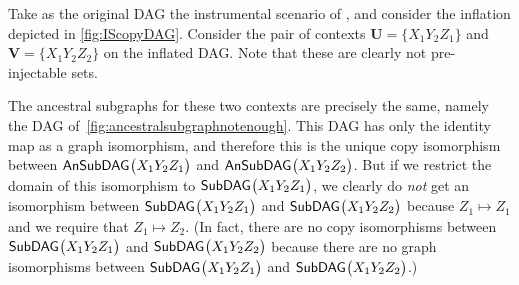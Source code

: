 {Take as the original DAG the instrumental scenario of \citet{pearl1995instrumental}, and consider the inflation depicted in \cref{fig:IScopyDAG}.  Consider the pair of contexts $\bm{U} = \{ X_1 Y_2 Z_1\}$ and $\bm{V}= \{ X_1 Y_2 Z_2\}$ on the inflated DAG.  Note that these are clearly not pre-injectable sets. 

The ancestral subgraphs for these two contexts are precisely the same, namely the DAG of~\cref{fig:ancestralsubgraphnotenough}.  This DAG has only the identity map as a graph isomorphism, and therefore this is the unique copy isomorphism between ${\operatorname{\mathsf{AnSubDAG}}_{}}\bigl\lparen X_1 Y_2 Z_1\bigr\rparen$ and ${\operatorname{\mathsf{AnSubDAG}}_{}}\bigl\lparen X_1 Y_2 Z_2\bigr\rparen$.  But if we restrict the domain of this isomorphism to ${\operatorname{\mathsf{SubDAG}}_{}}\bigl\lparen X_1 Y_2 Z_1\bigr\rparen$, we clearly do {\em not} get an isomorphism between ${\operatorname{\mathsf{SubDAG}}_{}}\bigl\lparen X_1 Y_2 Z_1\bigr\rparen$ and ${\operatorname{\mathsf{SubDAG}}_{}}\bigl\lparen X_1 Y_2 Z_2\bigr\rparen$ because $Z_1 \mapsto Z_1$ and we require that $Z_1 \mapsto Z_2$.  (In fact, there are no copy isomorphisms between ${\operatorname{\mathsf{SubDAG}}_{}}\bigl\lparen X_1 Y_2 Z_1\bigr\rparen$ and ${\operatorname{\mathsf{SubDAG}}_{}}\bigl\lparen X_1 Y_2 Z_2\bigr\rparen$ because there are no graph isomorphisms between ${\operatorname{\mathsf{SubDAG}}_{}}\bigl\lparen X_1 Y_2 Z_1\bigr\rparen$ and ${\operatorname{\mathsf{SubDAG}}_{}}\bigl\lparen X_1 Y_2 Z_2\bigr\rparen$.)  %



}
